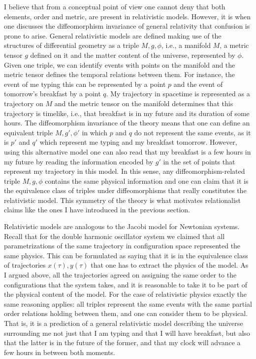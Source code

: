\documentclass[12 pt]{article}
\begin{document}
I believe that from a conceptual point of view one cannot deny that both elements, order and metric, are present in relativistic models. However, it is when one discusses the diffeomorphism invariance of general relativity that confusion is prone to arise. General relativistic models are defined making use of the structures of differential geometry as a triple $M,g,\phi$, i.e., a manifold $M$, a metric tensor $g$ defined on it and the matter content of the universe, represented by $\phi$. Given one triple, we can identify events with points on the manifold and the metric tensor defines the temporal relations between them. For instance, the event of me typing this can be represented by a point $p$ and the event of tomorrow's breakfast by a point $q$. My trajectory in spacetime is represented as a trajectory on $M$ and the metric tensor on the manifold determines that this trajectory is timelike, i.e., that breakfast is in my future and its duration of some hours. The diffeomorphism invariance of the theory means that one can define an equivalent triple $M,g',\phi'$ in which $p$ and $q$ do not represent the same events, as it is $p'$ and $q'$ which represent me typing and my breakfast tomorrow. However, using this alternative model one can also read that my breakfast is a few hours in my future by reading the information encoded by $g'$ in the set of points that represent my trajectory in this model. In this sense, any diffeomorphism-related triple $M,g,\phi$ contains the same physical information and one can claim that it is the equivalence class of triples under diffeomorphisms that really constitutes the relativistic model. This symmetry of the theory is what motivates relationalist claims like the ones I have introduced in the previous section.

Relativistic models are analogous to the Jacobi model for Newtonian systems. Recall that for the double harmonic oscillator system we claimed that all parametrizations of the same trajectory in configuration space represented the same physics. This can be formulated as saying that it is in the equivalence class of trajectories $x(\tau),y(\tau)$ that one has to extract the physics of the model. As I argued above, all the trajectories agreed on assigning the same order to the configurations that the system takes, and it is reasonable to take it to be part of the physical content of the model. For the case of relativistic physics exactly the same reasoning applies: all triples represent the same events with the same partial order relations holding between them, and one can consider them to be physical. That is, it is a prediction of a general relativistic model describing the universe surrounding me not just that I am typing and that I will have breakfast, but also that the latter is in the future of the former, and that my clock will advance a few hours in between both moments.
\end{document}

